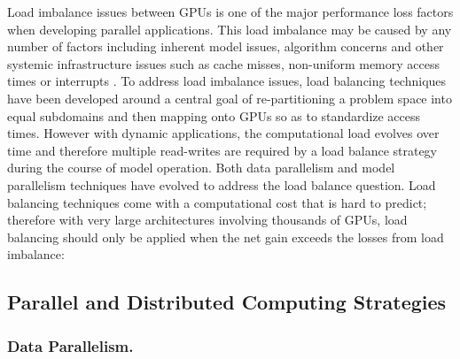 \documentclass[10pt]{article}[draft]
\begin{document}
Load imbalance issues between GPUs is one of the major performance loss factors when developing parallel applications.  This load imbalance may be caused by any number of factors including inherent model issues, algorithm concerns and other systemic infrastructure issues such as cache misses, non-uniform memory access times or interrupts \cite{https://edoc.unibas.ch/59514/1/20180128130357_5a6dbc2d9750f.pdf, https://arxiv.org/pdf/1909.07168.pdf}. To address load imbalance issues, load balancing techniques have been developed around a central goal of re-partitioning a problem space into equal subdomains and then mapping onto GPUs so as to standardize access times. However with dynamic applications, the computational load evolves over time and therefore multiple read-writes are required by a load balance strategy during the course of model operation. Both data parallelism and model parallelism techniques have evolved to address the load balance question. Load balancing techniques come with a computational cost that is hard to predict; therefore with very large architectures involving thousands of GPUs, load balancing should only be applied when the net gain exceeds the losses from load imbalance:


 \subsection{Parallel and Distributed Computing Strategies}
 
  \subsubsection{Data Parallelism.}
  
\end{document}
